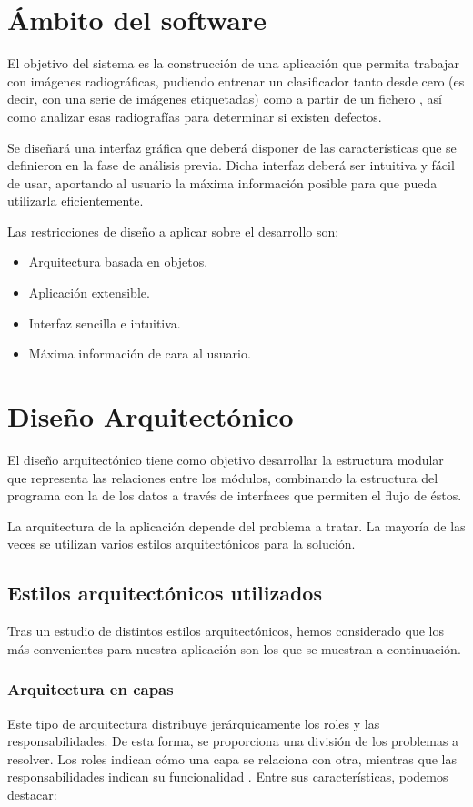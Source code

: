 \newpage

\section{Ámbito del software}
El objetivo del sistema es la construcción de una aplicación que permita trabajar con imágenes radiográficas, pudiendo entrenar un clasificador tanto desde cero (es decir, con una serie de imágenes etiquetadas) como a partir de un fichero \arff{}, así como analizar esas radiografías para determinar si existen defectos.

Se diseñará una interfaz gráfica que deberá disponer de las características que se definieron en la fase de análisis previa. Dicha interfaz deberá ser intuitiva y fácil de usar, aportando al usuario la máxima información posible para que pueda utilizarla eficientemente.

Las restricciones de diseño a aplicar sobre el desarrollo son:
\begin{itemize}
 \item Arquitectura basada en objetos.
 \item Aplicación extensible.
 \item Interfaz sencilla e intuitiva.
 \item Máxima información de cara al usuario.
\end{itemize}

\newpage

\section{Diseño Arquitectónico}
El diseño arquitectónico tiene como objetivo desarrollar la estructura modular que representa las relaciones entre los módulos, combinando la estructura del programa con la de los datos a través de interfaces que permiten el flujo de éstos.

La arquitectura de la aplicación depende del problema a tratar. La mayoría de las veces se utilizan varios estilos arquitectónicos para la solución.

\subsection{Estilos arquitectónicos utilizados}
Tras un estudio de distintos estilos arquitectónicos, hemos considerado que los más convenientes para nuestra aplicación son los que se muestran a continuación.

\subsubsection{Arquitectura en capas}
Este tipo de arquitectura distribuye jerárquicamente los roles y las responsabilidades. De esta forma, se proporciona una división de los problemas a resolver. Los roles indican cómo una capa se relaciona con otra, mientras que las responsabilidades indican su funcionalidad \cite{arquitectura}. Entre sus características, podemos destacar:

